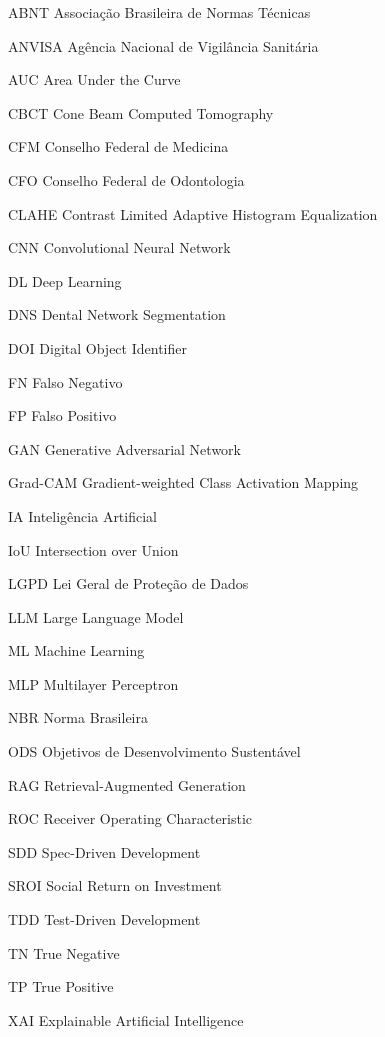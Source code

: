 
\begin{siglas}
  \item[ABNT] Associação Brasileira de Normas Técnicas
  \item[ANVISA] Agência Nacional de Vigilância Sanitária
  \item[AUC] Area Under the Curve
  \item[CBCT] Cone Beam Computed Tomography
  \item[CFM] Conselho Federal de Medicina
  \item[CFO] Conselho Federal de Odontologia
  \item[CLAHE] Contrast Limited Adaptive Histogram Equalization
  \item[CNN] Convolutional Neural Network
  \item[DL] Deep Learning
  \item[DNS] Dental Network Segmentation
  \item[DOI] Digital Object Identifier
  \item[FN] Falso Negativo
  \item[FP] Falso Positivo
  \item[GAN] Generative Adversarial Network
  \item[Grad-CAM] Gradient-weighted Class Activation Mapping
  \item[IA] Inteligência Artificial
  \item[IoU] Intersection over Union
  \item[LGPD] Lei Geral de Proteção de Dados
  \item[LLM] Large Language Model
  \item[ML] Machine Learning
  \item[MLP] Multilayer Perceptron
  \item[NBR] Norma Brasileira
  \item[ODS] Objetivos de Desenvolvimento Sustentável
  \item[RAG] Retrieval-Augmented Generation
  \item[ROC] Receiver Operating Characteristic
  \item[SDD] Spec-Driven Development
  \item[SROI] Social Return on Investment
  \item[TDD] Test-Driven Development
  \item[TN] True Negative
  \item[TP] True Positive
  \item[XAI] Explainable Artificial Intelligence
\end{siglas}
